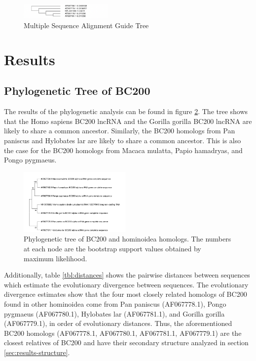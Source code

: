 \documentclass[conference, 11pt]{IEEEtran}
\begin{document}
\begin{figure}[ht]
  \centering
  \label{fig:Guide-tree}
  \includegraphics[width=0.4\textwidth]{figs/guidetree.png}
  \caption{Multiple Sequence Alignment Guide Tree}
\end{figure}

\section{Results}\label{sec:results}

\subsection{Phylogenetic Tree of BC200}

The results of the phylogenetic analysis can be found in figure \ref{fig:phylo-tree}. 
The tree shows that the Homo sapiens BC200 lncRNA and the Gorilla gorilla BC200 lncRNA are likely to share a common ancestor. 
Similarly, the BC200 homologs from Pan paniscus and Hylobates lar are likely to share a common ancestor. 
This is also the case for the BC200 homologs from Macaca mulatta, Papio hamadryas, and Pongo pygmaeus. 

\begin{figure}[ht]
  \centering
  \includegraphics[width=0.485\textwidth]{figs/phylogenetic-tree.jpg}
  \caption{Phylogenetic tree of BC200 and hominoidea homologs. The numbers at each node are the bootstrap support values obtained by maximum likelihood.}
  \label{fig:phylo-tree}
\end{figure}

Additionally, table \ref{tbl:distances} shows the pairwise distances between sequences which estimate the evolutionary divergence between sequences. 
The evolutionary divergence estimates show that the four most closely related homologs of BC200 found in other hominoidea come from Pan paniscus (AF067778.1), Pongo pygmaeus (AF067780.1), Hylobates lar (AF067781.1), and Gorilla gorilla (AF067779.1), in order of evolutionary distances. 
Thus, the aforementioned BC200 homologs (AF067778.1, AF067780.1, AF067781.1, AF067779.1) are the closest relatives of BC200 and have their secondary structure analyzed in section \ref{sec:results-structure}.
\end{document}
